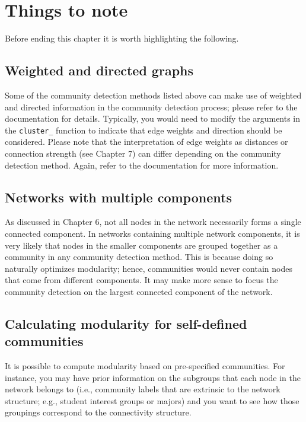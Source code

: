 \documentclass[
]{book}
\begin{document}
\section{Things to note}\label{things-to-note}

Before ending this chapter it is worth highlighting the following.

\subsection{Weighted and directed graphs}\label{weighted-and-directed-graphs}

Some of the community detection methods listed above can make use of weighted and directed information in the community detection process; please refer to the documentation for details. Typically, you would need to modify the arguments in the \texttt{cluster\_} function to indicate that edge weights and direction should be considered. Please note that the interpretation of edge weights as distances or connection strength (see Chapter 7) can differ depending on the community detection method. Again, refer to the documentation for more information.

\subsection{Networks with multiple components}\label{networks-with-multiple-components}

As discussed in Chapter 6, not all nodes in the network necessarily forms a single connected component. In networks containing multiple network components, it is very likely that nodes in the smaller components are grouped together as a community in any community detection method. This is because doing so naturally optimizes modularity; hence, communities would never contain nodes that come from different components. It may make more sense to focus the community detection on the largest connected component of the network.

\subsection{Calculating modularity for self-defined communities}\label{calculating-modularity-for-self-defined-communities}

It is possible to compute modularity based on pre-specified communities. For instance, you may have prior information on the subgroups that each node in the network belongs to (i.e., community labels that are extrinsic to the network structure; e.g., student interest groups or majors) and you want to see how those groupings correspond to the connectivity structure.
\end{document}
